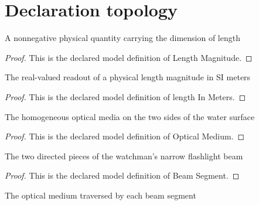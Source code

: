 \section{Declaration topology}
\begin{definition}
  \label{def:physics:phyx-mini-0135:phyxminiproblems-problemphyxmini0135-lengthmagnitude}
  A nonnegative physical quantity carrying the dimension of length
\end{definition}
\begin{proof}
  This is the declared model definition of Length Magnitude.
\end{proof}
\begin{definition}
  \label{def:physics:phyx-mini-0135:phyxminiproblems-problemphyxmini0135-lengthinmeters}
  The real-valued readout of a physical length magnitude in SI meters
\end{definition}
\begin{proof}
  This is the declared model definition of length In Meters.
\end{proof}
\begin{definition}
  \label{def:physics:phyx-mini-0135:phyxminiproblems-problemphyxmini0135-opticalmedium}
  The homogeneous optical media on the two sides of the water surface
\end{definition}
\begin{proof}
  This is the declared model definition of Optical Medium.
\end{proof}
\begin{definition}
  \label{def:physics:phyx-mini-0135:phyxminiproblems-problemphyxmini0135-beamsegment}
  The two directed pieces of the watchman's narrow flashlight beam
\end{definition}
\begin{proof}
  This is the declared model definition of Beam Segment.
\end{proof}
\begin{definition}[medium]
  \label{def:physics:phyx-mini-0135:phyxminiproblems-problemphyxmini0135-beamsegment-medium}
  The optical medium traversed by each beam segment
\end{definition}
